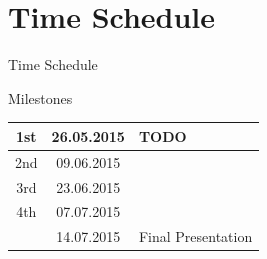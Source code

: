 \documentclass{beamer}
\newcommand{\beginbackup}{
   \newcounter{framenumbervorappendix}
   \setcounter{framenumbervorappendix}{\value{framenumber}}
}
\newcommand{\backupend}{
   \addtocounter{framenumbervorappendix}{-\value{framenumber}}
   \addtocounter{framenumber}{\value{framenumbervorappendix}}
}
\begin{document}
\section{Time Schedule}
\begin{frame}{Time Schedule}

	{\Huge Milestones}
	\vspace{1cm}


	\Large
	\begin{tabular}{|c|c|l|}
		\hline
		1st	&	26.05.2015	&	TODO \\ \hline
		2nd	&	09.06.2015	&	\\ \hline
		3rd	&	23.06.2015	&	\\ \hline
		4th	&	07.07.2015	&	\\ \hline
			&	14.07.2015	&	Final Presentation	\\ \hline
	\end{tabular}

\end{frame}







\end{document}

